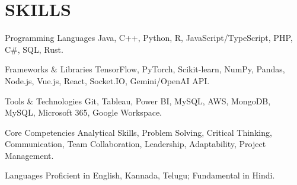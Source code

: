 \documentclass[10pt, letterpaper]{article}
\begin{document}
\vspace{\headerSpacing}

\section{SKILLS}

\vspace{\entrySpacing}
\begin{skillcategory}{Programming Languages}
    Java, C++, Python, R, JavaScript/TypeScript, PHP, C\#, SQL, Rust.
\end{skillcategory}

\vspace{\entrySpacing}
\begin{skillcategory}{Frameworks \& Libraries}
    TensorFlow, PyTorch, Scikit-learn, NumPy, Pandas, Node.js, Vue.js, React, Socket.IO, Gemini/OpenAI API.
\end{skillcategory}

\vspace{\entrySpacing}
\begin{skillcategory}{Tools \& Technologies}
    Git, Tableau, Power BI, MySQL, AWS, MongoDB, MySQL, Microsoft 365, Google Workspace.
\end{skillcategory}

\vspace{\entrySpacing}
\begin{skillcategory}{Core Competencies}
    Analytical Skills, Problem Solving, Critical Thinking, Communication, Team Collaboration, Leadership, Adaptability, Project Management.
\end{skillcategory}

\vspace{\entrySpacing}
\begin{skillcategory}{Languages}
    Proficient in English, Kannada, Telugu; Fundamental in Hindi.
\end{skillcategory}

\vspace{\headerSpacing}

\end{document}
